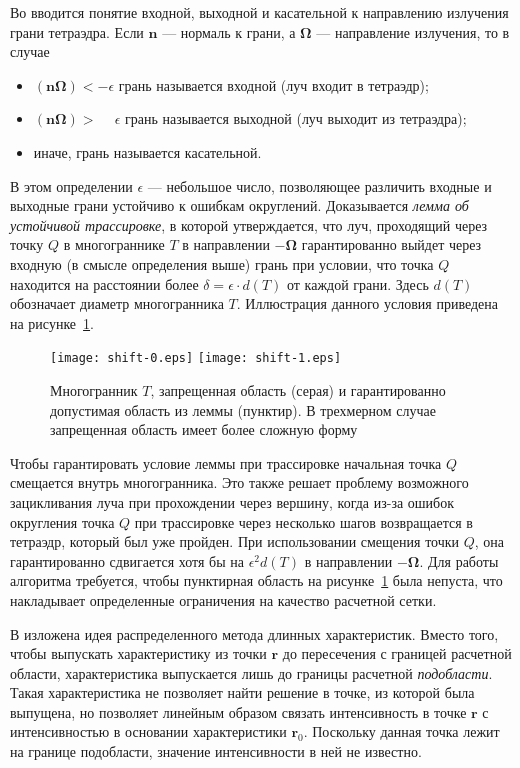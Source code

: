 Во  вводится понятие входной, выходной и касательной к направлению излучения грани тетраэдра. Если $\mathbf n$ --- нормаль к грани, а $\boldsymbol \Omega$ --- направление излучения, то в случае
\begin{itemize}
\item $(\mathbf n \boldsymbol \Omega) < -\epsilon$ грань называется входной (луч входит в тетраэдр);
\item $(\mathbf n \boldsymbol \Omega) > \phantom{-}\epsilon$ грань называется выходной (луч выходит из тетраэдра);
\item иначе, грань называется касательной.
\end{itemize}
В этом определении $\epsilon$ --- небольшое число, позволяющее различить входные и выходные грани устойчиво к ошибкам округлений. Доказывается 
\emph{лемма об устойчивой трассировке}, в которой утверждается, что луч, проходящий через точку $Q$ в многограннике $T$ в направлении $-\boldsymbol \Omega$ гарантированно выйдет через входную (в смысле определения выше) грань при условии, что точка $Q$ находится на расстоянии более $\delta = \epsilon \cdot d(T)$ от каждой грани. Здесь $d(T)$ обозначает диаметр многогранника $T$. Иллюстрация данного условия приведена на рисунке~\ref{fig:shift}.
\begin{figure}[ht!]
\centering
\texttt{[image: shift-0.eps]}
\texttt{[image: shift-1.eps]}
\caption{Многогранник $T$, запрещенная область (серая) и гарантированно допустимая область из леммы (пунктир). В трехмерном случае запрещенная область имеет более сложную форму}
\label{fig:shift}
\end{figure}

Чтобы гарантировать условие леммы при трассировке начальная точка $Q$ смещается внутрь многогранника. Это также решает проблему возможного зацикливания луча при прохождении через вершину, когда из-за ошибок округления точка $Q$ при трассировке через несколько шагов возвращается в тетраэдр, который был уже пройден. При использовании смещения точки $Q$, она гарантированно сдвигается хотя бы на $\epsilon^2 d(T)$ в направлении $-\boldsymbol \Omega$. Для работы алгоритма требуется, чтобы пунктирная область на рисунке~\ref{fig:shift} была непуста, что накладывает определенные ограничения на качество расчетной сетки.

В  изложена идея распределенного метода длинных характеристик. Вместо того, чтобы выпускать характеристику из точки $\mathbf r$ до пересечения с границей расчетной области, характеристика выпускается лишь до границы расчетной \emph{подобласти}. Такая характеристика не позволяет найти решение в точке, из которой была выпущена, но позволяет линейным образом связать интенсивность в точке $\mathbf r$ с интенсивностью в основании характеристики $\mathbf r_0$. Поскольку данная точка лежит на границе подобласти, значение интенсивности в ней не известно.

